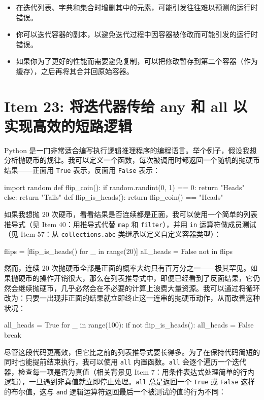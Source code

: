 \begin{itemize}
\item 在迭代列表、字典和集合时增删其中的元素，可能引发往往难以预测的运行时错误。
\item 你可以迭代容器的副本，以避免迭代过程中因容器被修改而可能引发的运行时错误。
\item 如果你为了更好的性能而需要避免复制，可以把修改暂存到第二个容器（作为缓存），之后再将其合并回原始容器。
\end{itemize}

\section{Item 23: 将迭代器传给 any 和 all 以实现高效的短路逻辑}

Python 是一门非常适合编写执行逻辑推理程序的编程语言。举个例子，假设我想分析抛硬币的规律。我可以定义一个函数，每次被调用时都返回一个随机的抛硬币结果——正面用 \texttt{True} 表示，反面用 \texttt{False} 表示：

\begin{codebox}[python]
import random
def flip_coin():
    if random.randint(0, 1) == 0:
        return "Heads"
    else:
        return "Tails"
def flip_is_heads():
    return flip_coin() == "Heads"
\end{codebox}

如果我想抛 20 次硬币，看看结果是否连续都是正面，我可以使用一个简单的列表推导式（见 Item 40：用推导式代替 \texttt{map} 和 \texttt{filter}），并用 \texttt{in} 运算符做成员测试（见 Item 57：从 \texttt{collections.abc} 类继承以定义自定义容器类型）：

\begin{codebox}[python]
flips = [flip_is_heads() for _ in range(20)]
all_heads = False not in flips
\end{codebox}

然而，连续 20 次抛硬币全部是正面的概率大约只有百万分之一——极其罕见。如果抛硬币的操作开销很大，那么在列表推导式中，即便已经看到了反面结果，它仍然会继续抛硬币，几乎必然会在不必要的计算上浪费大量资源。我可以通过将循环改为：只要一出现非正面的结果就立即终止这一连串的抛硬币动作，从而改善这种状况：

\begin{codebox}[python]
all_heads = True
for _ in range(100):
    if not flip_is_heads():
        all_heads = False
        break
\end{codebox}

尽管这段代码更高效，但它比之前的列表推导式要长得多。为了在保持代码简短的同时也能提前结束执行，我可以使用 \texttt{all} 内置函数。\texttt{all} 会逐个遍历一个迭代器，检查每一项是否为真值（相关背景见 Item 7：用条件表达式处理简单的行内逻辑），一旦遇到非真值就立即停止处理。\texttt{all} 总是返回一个 \texttt{True} 或 \texttt{False} 这样的布尔值，这与 \texttt{and} 逻辑运算符返回最后一个被测试的值的行为不同：

